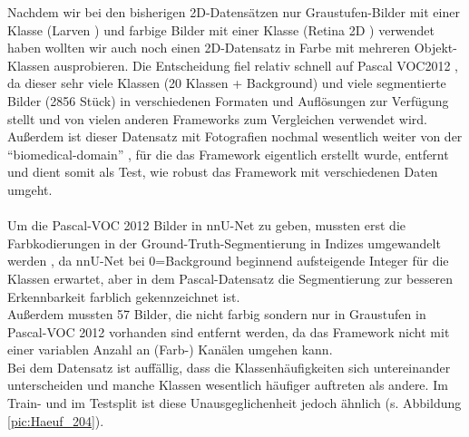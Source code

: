 Nachdem wir bei den bisherigen 2D-Datensätzen nur Graustufen-Bilder mit einer Klasse (Larven \cite{larven}) und farbige Bilder mit einer Klasse (Retina 2D \cite{retina2d}) verwendet haben wollten wir auch noch einen 2D-Datensatz in Farbe mit mehreren Objekt-Klassen ausprobieren. Die Entscheidung fiel relativ schnell auf Pascal VOC2012 \cite{PascalVOCDatensatz}, da dieser sehr viele Klassen (20 Klassen + Background) und viele segmentierte Bilder (2856 Stück) in verschiedenen Formaten und Auflösungen zur Verfügung stellt und von vielen anderen Frameworks zum Vergleichen verwendet wird. Außerdem ist dieser Datensatz mit Fotografien nochmal wesentlich weiter von der \enquote{biomedical-domain} \cite{nnunetGithub2D-Daten}, für die das Framework eigentlich erstellt wurde, entfernt und dient somit als Test, wie robust das Framework mit verschiedenen Daten umgeht.\\\\
Um die Pascal-VOC 2012 Bilder in nnU-Net zu geben, mussten erst die Farbkodierungen in der Ground-Truth-Segmentierung in Indizes umgewandelt werden \cite{autoMLGithub}, da nnU-Net bei 0=Background beginnend aufsteigende Integer für die Klassen erwartet, aber in dem Pascal-Datensatz \cite{PascalVOCDatensatz} die Segmentierung zur besseren Erkennbarkeit farblich gekennzeichnet ist.\\
Außerdem mussten 57 Bilder, die nicht farbig sondern nur in Graustufen in Pascal-VOC 2012 \cite{PascalVOCDatensatz} vorhanden sind entfernt werden, da das Framework nicht mit einer variablen Anzahl an (Farb-) Kanälen umgehen kann.\\
Bei dem Datensatz ist auffällig, dass die Klassenhäufigkeiten sich untereinander unterscheiden und manche Klassen wesentlich häufiger auftreten als andere. Im Train- und im Testsplit ist diese Unausgeglichenheit jedoch ähnlich (s. Abbildung \ref{pic:Haeuf_204}).

